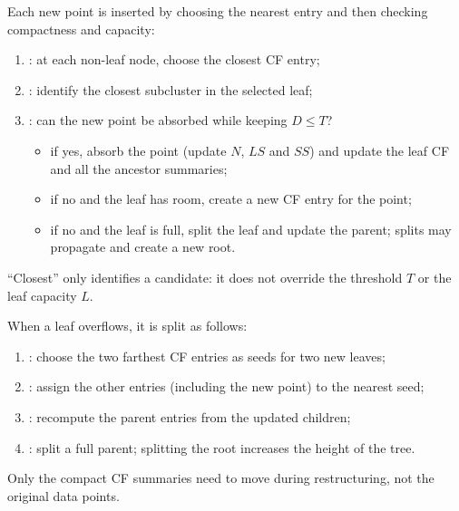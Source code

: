 Each new point is inserted by choosing the nearest entry and then checking compactness and capacity:
\begin{enumerate}
  \item {}: at each non-leaf node, choose the closest CF entry;
  \item {}: identify the closest subcluster in the selected leaf;
  \item {}: can the new point be absorbed while keeping $D \le T$?
  \begin{itemize}
    \item if yes, absorb the point (update $N$, $LS$ and $SS$) and update the leaf CF and all the ancestor summaries;
    \item if no and the leaf has room, create a new CF entry for the point;
    \item if no and the leaf is full, split the leaf and update the parent; splits may propagate and create a new root.
  \end{itemize}
\end{enumerate}
``Closest'' only identifies a candidate: it does not override the threshold $T$ or the leaf capacity $L$.

When a leaf overflows, it is split as follows:
\begin{enumerate}
  \item {}: choose the two farthest CF entries as seeds for two new leaves;
  \item {}: assign the other entries (including the new point) to the nearest seed;
  \item {}: recompute the parent entries from the updated children;
  \item {}: split a full parent; splitting the root increases the height of the tree.
\end{enumerate}
Only the compact CF summaries need to move during restructuring, not the original data points.

